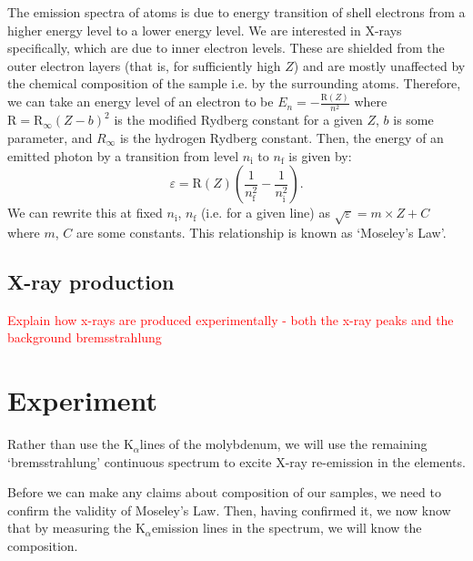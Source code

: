 \documentclass[11pt,a4paper,twoside,onecolumn]{article}
\newcommand{\reminder}[1]{\textcolor{red}{#1}}
\newcommand{\rydberg}{\mathrm{R}}
\newcommand{\Kalpha}{$\mathrm{K}_\alpha$}
\begin{document}
The emission spectra of atoms is due to energy transition of shell electrons from a higher energy level to a lower energy level. We are interested in X-rays specifically, which are due to inner electron levels. These are shielded from the outer electron layers (that is, for sufficiently high $Z$) and are mostly unaffected by the chemical composition of the sample i.e. by the surrounding atoms. Therefore, we can take an energy level of an electron to be $E_n = -\frac{\rydberg\left(Z\right)}{n^2}$ where $\rydberg = \rydberg_\infty \left(Z - b\right)^2$ is the modified Rydberg constant for a given $Z$, $b$ is some parameter, and $R_\infty$ is the hydrogen Rydberg constant. Then, the energy of an emitted photon by a transition from level $n_\mathrm{i}$ to $n_\mathrm{f}$ is given by:
\begin{equation}
    \varepsilon = \rydberg\left(Z\right) \left(\frac{1}{n_\mathrm{f}^2} - \frac{1}{n_\mathrm{i}^2}\right).
\end{equation}
We can rewrite this at fixed $n_\mathrm{i}$, $n_\mathrm{f}$ (i.e. for a given line) as $\sqrt{\varepsilon} = m \times Z + C$ where $m$, $C$ are some constants. This relationship is known as `Moseley's Law'.

\subsection{X-ray production}
\reminder{Explain how x-rays are produced experimentally - both the x-ray peaks and the background bremsstrahlung}

\section{Experiment}

Rather than use the \Kalpha lines of the molybdenum, we will use the remaining `bremsstrahlung' continuous spectrum to excite X-ray re-emission in the elements.

Before we can make any claims about composition of our samples, we need to confirm the validity of Moseley's Law. Then, having confirmed it, we now know that by measuring the \Kalpha emission lines in the spectrum, we will know the composition.
\end{document}
